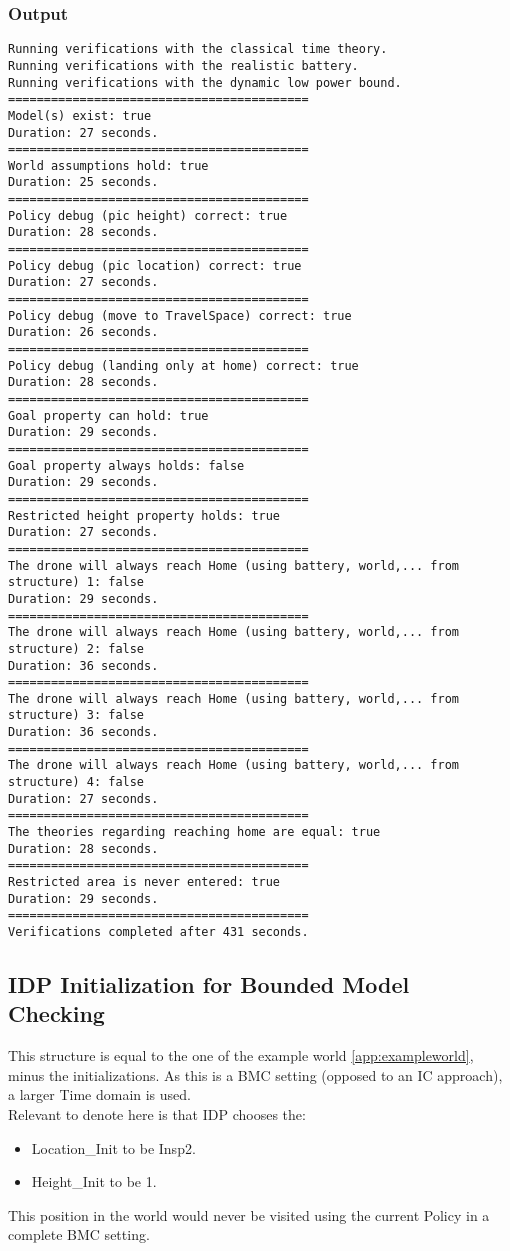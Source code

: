 \documentclass[12pt]{extarticle}
\begin{document}
\subsubsection*{Output}
\begin{lstlisting}[basicstyle=\tiny]
Running verifications with the classical time theory.
Running verifications with the realistic battery.
Running verifications with the dynamic low power bound.
==========================================
Model(s) exist: true
Duration: 27 seconds.
==========================================
World assumptions hold: true
Duration: 25 seconds.
==========================================
Policy debug (pic height) correct: true
Duration: 28 seconds.
==========================================
Policy debug (pic location) correct: true
Duration: 27 seconds.
==========================================
Policy debug (move to TravelSpace) correct: true
Duration: 26 seconds.
==========================================
Policy debug (landing only at home) correct: true
Duration: 28 seconds.
==========================================
Goal property can hold: true
Duration: 29 seconds.
==========================================
Goal property always holds: false
Duration: 29 seconds.
==========================================
Restricted height property holds: true
Duration: 27 seconds.
==========================================
The drone will always reach Home (using battery, world,... from structure) 1: false
Duration: 29 seconds.
==========================================
The drone will always reach Home (using battery, world,... from structure) 2: false
Duration: 36 seconds.
==========================================
The drone will always reach Home (using battery, world,... from structure) 3: false
Duration: 36 seconds.
==========================================
The drone will always reach Home (using battery, world,... from structure) 4: false
Duration: 27 seconds.
==========================================
The theories regarding reaching home are equal: true
Duration: 28 seconds.
==========================================
Restricted area is never entered: true
Duration: 29 seconds.
==========================================
Verifications completed after 431 seconds.
\end{lstlisting}

\subsection{IDP Initialization for Bounded Model Checking}
\label{app:idp-init-bmc}
This structure is equal to the one of the example world \ref{app:exampleworld}, minus the initializations. As this is a BMC setting (opposed to an IC approach), a larger Time domain is used.\\
Relevant to denote here is that IDP chooses the:
\begin{itemize}
    \item Location\_Init to be Insp2.
    \item Height\_Init to be 1.
\end{itemize}
This position in the world would never be visited using the current Policy in a complete BMC setting.
\end{document}

